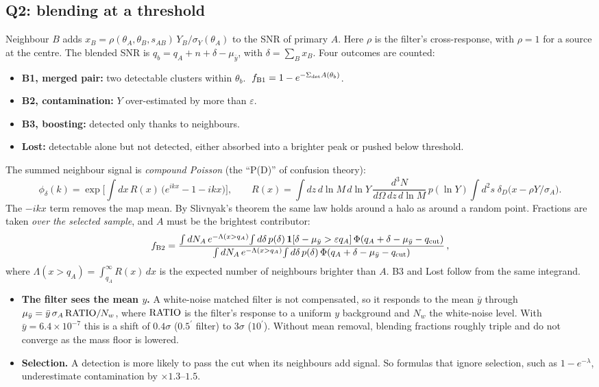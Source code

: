\documentclass[10pt]{article}
\newcommand{\amin}{^{\prime}}
\begin{document}
\subsection{Q2: blending at a threshold}
Neighbour $B$ adds $x_B=\rho(\theta_A,\theta_B,s_{AB})\,Y_B/\sigma_Y(\theta_A)$ to the SNR of primary $A$. Here $\rho$ is the filter's cross-response, with $\rho=1$ for a source at the centre. The blended SNR is $q_b=q_A+n+\delta-\mu_{\bar y}$, with $\delta=\sum_Bx_B$. Four outcomes are counted:
\begin{itemize}
\item \textbf{B1, merged pair:} two detectable clusters within $\theta_b$. $\;f_{\rm B1}=1-e^{-\Sigma_{\rm det}A(\theta_b)}$.
\item \textbf{B2, contamination:} $Y$ over-estimated by more than $\varepsilon$.
\item \textbf{B3, boosting:} detected only thanks to neighbours.
\item \textbf{Lost:} detectable alone but not detected, either absorbed into a brighter peak or pushed below threshold.
\end{itemize}
The summed neighbour signal is \emph{compound Poisson} (the ``P(D)'' of confusion theory):
\begin{equation*}
\phi_\delta(k)=\exp\!\Big[\int\!dx\,R(x)\,\big(e^{ikx}-1-ikx\big)\Big],\qquad
R(x)=\!\int\! dz\,d\ln M\,d\ln Y\,\frac{d^3N}{d\Omega\,dz\,d\ln M}\,p(\ln Y)\!\int\! d^2s\;\delta_D\!\big(x-\rho Y/\sigma_A\big).
\end{equation*}
The $-ikx$ term removes the map mean. By Slivnyak's theorem the same law holds around a halo as around a random point. Fractions are taken \emph{over the selected sample}, and $A$ must be the brightest contributor:
\begin{equation*}
f_{\rm B2}=\frac{\int dN_A\,e^{-\Lambda(x>q_A)}\!\int d\delta\,p(\delta)\,\mathbf 1[\delta-\mu_{\bar y}>\varepsilon q_A]\,\Phi(q_A+\delta-\mu_{\bar y}-q_{\rm cut})}{\int dN_A\,e^{-\Lambda(x>q_A)}\!\int d\delta\,p(\delta)\,\Phi(q_A+\delta-\mu_{\bar y}-q_{\rm cut})}\,,
\end{equation*}
where $\Lambda(x>q_A)=\int_{q_A}^\infty R(x)\,dx$ is the expected number of neighbours brighter than $A$. B3 and Lost follow from the same integrand.
\begin{itemize}
\item \textbf{The filter sees the mean $y$.} A white-noise matched filter is not compensated, so it responds to the mean $\bar y$ through $\mu_{\bar y}=\bar y\,\sigma_A\,{\rm RATIO}/N_w$, where ${\rm RATIO}$ is the filter's response to a uniform $y$ background and $N_w$ the white-noise level. With $\bar y=6.4\times10^{-7}$ this is a shift of $0.4\sigma$ ($0.5\amin$ filter) to $3\sigma$ ($10\amin$). Without mean removal, blending fractions roughly triple and do not converge as the mass floor is lowered.
\item \textbf{Selection.} A detection is more likely to pass the cut when its neighbours add signal. So formulas that ignore selection, such as $1-e^{-\lambda}$, underestimate contamination by $\times1.3$--$1.5$.
\end{itemize}
\end{document}
